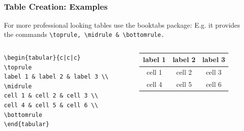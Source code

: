 \documentclass[[newPxFont]{beamer}
\begin{document}
\subsection{}
\begin{frame}[fragile]
  \frametitle{Table Creation: Examples}
  For more professional looking tables use the booktabs package:
E.g. it provides the commands \verb+\toprule, \midrule & \bottomrule.+
\begin{columns}
\begin{column}{.5\textwidth}
\begin{small}
\begin{verbatim}
\begin{tabular}{c|c|c}
\toprule
label 1 & label 2 & label 3 \\
\midrule
cell 1 & cell 2 & cell 3 \\
cell 4 & cell 5 & cell 6 \\
\bottomrule
\end{tabular}
\end{verbatim}
\end{small}
\end{column}
\begin{column}{.5\textwidth}
\begin{tabular}{c|c|c}
\toprule
label 1 & label 2 & label 3 \\
\midrule
cell 1 & cell 2 & cell 3 \\
cell 4 & cell 5 & cell 6 \\
\bottomrule
\end{tabular}
    \end{column}
  \end{columns}
\end{frame}
\fi
\end{document}
